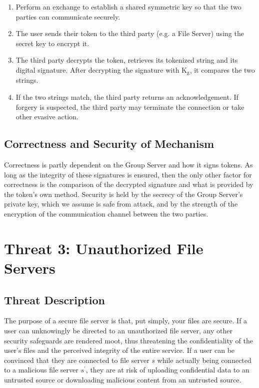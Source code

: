 \documentclass[11pt]{article}
\begin{document}
\begin{enumerate}
\item{}Perform an exchange to establish a shared symmetric key so that the two parties can communicate securely.
\item{}The user sends their token to the third party (e.g. a File Server) using the secret key to encrypt it.
\item{}The third party decrypts the token, retrieves its tokenized string and its digital signature. After decrypting the signature with K$_\text{g}$, it compares the two strings.
\item{}If the two strings match, the third party returns an acknowledgement. If forgery is suspected, the third party may terminate the connection or take other evasive action.
\end{enumerate}
\subsection{Correctness and Security of Mechanism}
Correctness is partly dependent on the Group Server and how it signs tokens. As long as the integrity of these signatures is ensured, then the only other factor for correctness is the comparison of the decrypted signature and what is provided by the token's own method. Security is held by the secrecy of the Group Server's private key, which we assume is safe from attack, and by the strength of the encryption of the communication channel between the two parties.
\section{Threat 3: Unauthorized File Servers}
\subsection{Threat Description}
The purpose of a secure file server is that, put simply, your files are secure. If a user can unknowingly be directed to an unauthorized file server, any other security safeguards are rendered moot, thus threatening the confidentiality of the user's files and the perceived integrity of the entire service. If a user can be convinced that they are connected to file server $s$ while actually being connected to a malicious file server $s^\prime$, they are at risk of uploading confidential data to an untrusted source or downloading malicious content from an untrusted source.
\end{document}
